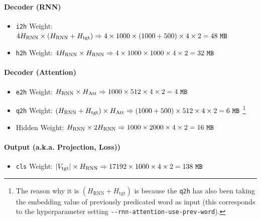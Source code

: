 \documentclass{article}
\begin{document}
\paragraph{Decoder (RNN)}
\begin{itemize}
  \item \lstinline{i2h} Weight: \(4H_\text{RNN}\times (H_\text{RNN} + H_\text{tgt})\Rightarrow 
  4\times 1000\times (1000 + 500)\times 4\times 2=48\text{ }\mathtt{MB}\)
  \item \lstinline{h2h} Weight: \(4H_\text{RNN}\times H_\text{RNN}\Rightarrow 
  4\times 1000\times 1000\times 4\times 2=32\text{ }\mathtt{MB}\)
\end{itemize}

\paragraph{Decoder (Attention)}
\begin{itemize}
  \item \lstinline{e2h} Weight: \(H_\text{RNN}\times H_\text{Att}\Rightarrow 1000\times 512\times 4\times 2 = 4\text{ }\mathtt{MB}\)
  \item \lstinline{q2h} Weight: \((H_\text{RNN} + H_\text{tgt})\times H_\text{Att}\Rightarrow 
  (1000 + 500)\times 512\times 4\times 2 = 6\text{ }\mathtt{MB}\)
  \footnote{The reason why it is \((H_\text{RNN} + H_\text{tgt})\) is because the \lstinline{q2h}
  has also been taking the embedding value of previously predicated word as input 
  (this corresponds to the hyperparameter setting \lstinline{--rnn-attention-use-prev-word}).}
  \item Hidden Weight: \(H_\text{RNN}\times 2H_\text{RNN}\Rightarrow 
  1000\times 2000\times 4\times 2=16\text{ }\mathtt{MB}\)
\end{itemize}

\paragraph{Output (a.k.a. Projection, Loss))}
\begin{itemize}
  \item \lstinline{cls} Weight: \(|V_\text{tgt}|\times H_\text{RNN}\Rightarrow 
  17192\times 1000\times 4\times 2=138\text{ }\mathtt{MB}\)
\end{itemize}


{\footnotesize }
\end{document}
